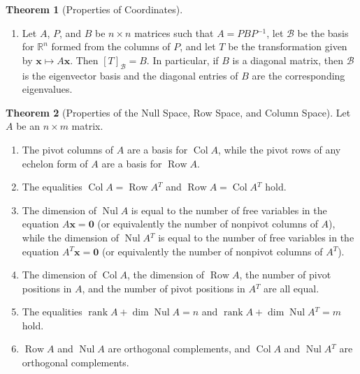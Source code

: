 \documentclass{myart}
\renewcommand{\vec}[1]{\ensuremath{\mathbf{#1}}}
\newcommand{\mat}[1]{\ensuremath{#1}}
\newcommand{\R}[1][]{\ensuremath{\mathbb{R}^{#1}}}
\newcommand{\by}{\ensuremath{\times}}
\newcommand{\MAT}[2][r]{\ensuremath{\begin{bmatrix*}[#1]#2\end{bmatrix*}}}
\newcommand{\set}[1]{\ensuremath{\{#1\}}}
\newcommand{\inv}{\ensuremath{^{-1}}}
\newcommand{\trans}{\ensuremath{^T}}
\DeclareMathOperator{\Nul}{Nul}
\DeclareMathOperator{\Col}{Col}
\DeclareMathOperator{\Row}{Row}
\newcommand{\basis}[1]{\ensuremath{\mathcal{#1}}}
\DeclareMathOperator{\rank}{rank}
\newcommand{\from}{\leftarrow}
\newcommand{\coord}[2]{\ensuremath{\left[#1\right]_{#2}}}
\newcommand{\transmat}[2]{\coord{#1}{#2}}
\newcommand{\transmatb}[3]{\coord{#1}{#2 \from #3}}
\newcommand{\many}[2][n]{\ensuremath{{#2}_1, \ldots, {#2}_{#1}}}
\theoremstyle{definition}
\newtheorem{thm}{Theorem}
\begin{document}
\begin{thm}[Properties of Coordinates]
\begin{enumerate}
    \set{\many{\vec c}} be bases for the vector spaces $V$ and $W$,
    respectively, and let $T: V \to W$ be a linear transformation.
    Then
    \begin{equation*}
      \transmatb{T}{\basis C}{\basis B} = \MAT{
        \coord{T(\vec b_1)}{\basis C} &
        \cdots &
        \coord{T(\vec b_n)}{\basis C}
      }.
    \end{equation*}
  \item Let \mat A, \mat P, and \mat B be $n \by n$ matrices such that
    $\mat A = \mat P\mat B\mat P\inv$, let \basis B be the basis for
    \R[n] formed from the columns of \mat P, and let $T$ be the
    transformation given by $\vec x \mapsto \mat A\vec x$. Then
    $\transmat{T}{\basis B} = \mat B$. In particular, if \mat B is a
    diagonal matrix, then \basis B is the eigenvector basis and the
    diagonal entries of \mat B are the corresponding eigenvalues.
  \end{enumerate}
\end{thm}

\begin{thm}[Properties of the Null Space, Row Space, and Column Space]
  Let \mat A be an $n \by m$ matrix.
  \begin{enumerate}
  \item The pivot columns of \mat A are a basis for $\Col \mat A$,
    while the pivot rows of any echelon form of \mat A are a basis for
    $\Row \mat A$.
  \item The equalities $\Col \mat A = \Row \mat A\trans$ and $\Row
    \mat A = \Col \mat A\trans$ hold.
  \item The dimension of $\Nul \mat A$ is equal to the number of free
    variables in the equation $\mat A\vec x = \vec 0$ (or equivalently
    the number of nonpivot columns of \mat A), while the dimension of
    $\Nul \mat A\trans$ is equal to the number of free variables in
    the equation $\mat A\trans\vec x = \vec 0$ (or equivalently the
    number of nonpivot columns of \mat A\trans).
  \item The dimension of $\Col \mat A$, the dimension of $\Row \mat
    A$, the number of pivot positions in \mat A, and the number of
    pivot positions in $\mat A\trans$ are all equal.
  \item The equalities $\rank \mat A + \dim \Nul \mat A = n$ and
    $\rank \mat A + \dim \Nul \mat A\trans = m$ hold.
  \item $\Row \mat A$ and $\Nul \mat A$ are orthogonal complements,
    and $\Col \mat A$ and $\Nul \mat A\trans$ are orthogonal
    complements.
  \end{enumerate}
\end{thm}
\end{document}

